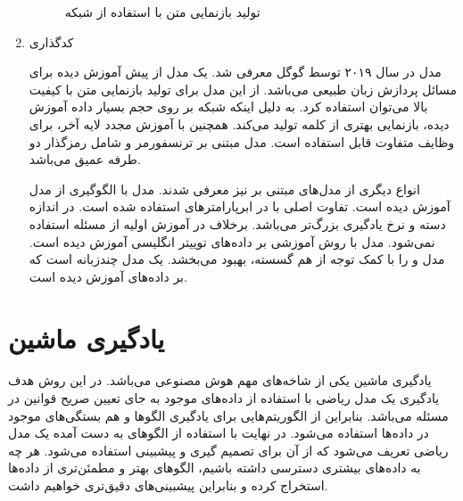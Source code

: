 \begin{enumerate}
 \begin{figure}[H]
 	\caption[تولید بازنمایی متن با استفاده از شبکه
 	]{تولید بازنمایی متن با استفاده از شبکه
  \cite{kim-2014-convolutional}	
 }
 	\label{cnn-embedding}
 \end{figure}
 \item کدگذاری
 
 
 مدل 
   \cite{devlin-etal-2019-bert}
در سال ۲۰۱۹ توسط گوگل معرفی شد.
 یک مدل از پیش آموزش دیده برای مسائل پردازش زبان طبیعی می‌باشد. از این مدل برای تولید بازنمایی متن با کیفیت بالا می‌توان استفاده کرد. به دلیل اینکه شبکه   بر روی حجم بسیار داده آموزش دیده، بازنمایی بهتری از کلمه تولید می‌کند. همچنین با آموزش مجدد لایه آخر، برای وظایف متفاوت قابل استفاده است. مدل  مبتنی بر ترنسفورمر و شامل رمزگذار دو طرفه عمیق می‌باشد.
 
 
 انواع دیگری از مدل‌های مبتنی بر
  نیز معرفی شدند. مدل 
 \cite{liu2019roberta}
 با الگوگیری از مدل
 آموزش دیده است. تفاوت اصلی 
 با
 در ابرپارامترهای استفاده شده است. در 
 اندازه دسته و نرخ یادگیری بزرگ‌تر می‌باشد. برخلاف
  در آموزش اولیه
از مسئله
استفاده نمی‌شود. مدل
  \cite{bertweet}
  با روش آموزشی 
بر داده‌های توییتر انگلیسی آموزش دیده است.  \cite{liu2019roberta}
مدل
 و
را با کمک توجه از هم گسسته، بهبود می‌بخشد.
\cite{conneau2019unsupervised}
یک مدل چندزبانه است که بر داده‌های
آموزش دیده است. 

\end{enumerate}

\section{یادگیری ماشین}
یادگیری ماشین
یکی از شاخە‌های مهم هوش مصنوعی می‌باشد. در این روش هدف یادگیری یک مدل ریاضی با استفاده از دادە‌های موجود به جای تعیین صریح قوانین در مسئله می‌باشد. بنابراین از الگوریتم‌هایی برای یادگیری الگوها و هم بستگی‌های موجود در داده‌ها استفاده می‌شود. در نهایت با استفاده از الگوهای به دست آمده یک مدل ریاضی تعریف می‌شود که از آن برای تصمیم گیری و پیشبینی استفاده می‌شود. هر چه به دادە‌های بیشتری دسترسی داشته باشیم، الگوهای بهتر و مطمئن‌تری از دادە‌ها استخراج کرده و بنابراین پیشبینی‌های دقیق‌تری خواهیم داشت.


